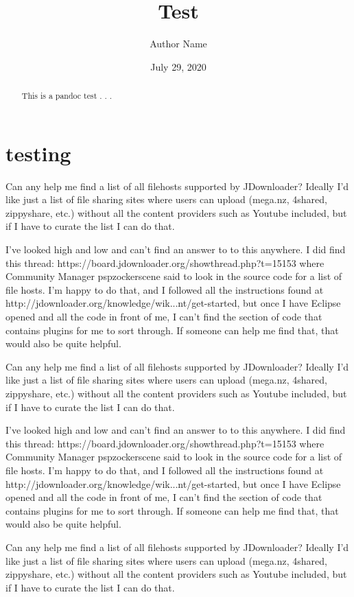 \documentclass[
]{article}
\title{Test}
\author{Author Name}
\date{July 29, 2020}
\begin{document}
\maketitle
\begin{abstract}
This is a pandoc test . . .
\end{abstract}

\hypertarget{Testing Sections}{%
\section{testing}\label{section}}

Can any help me find a list of all filehosts supported by JDownloader? Ideally I'd like just a list of file sharing sites where users can upload (mega.nz, 4shared, zippyshare, etc.) without all the content providers such as Youtube included, but if I have to curate the list I can do that.

I've looked high and low and can't find an answer to to this anywhere. I did find this thread: https://board.jdownloader.org/showthread.php?t=15153 where Community Manager pspzockerscene said to look in the source code for a list of file hosts. I'm happy to do that, and I followed all the instructions found at http://jdownloader.org/knowledge/wik...nt/get-started, but once I have Eclipse opened and all the code in front of me, I can't find the section of code that contains plugins for me to sort through. If someone can help me find that, that would also be quite helpful.

Can any help me find a list of all filehosts supported by JDownloader? Ideally I'd like just a list of file sharing sites where users can upload (mega.nz, 4shared, zippyshare, etc.) without all the content providers such as Youtube included, but if I have to curate the list I can do that.

I've looked high and low and can't find an answer to to this anywhere. I did find this thread: https://board.jdownloader.org/showthread.php?t=15153 where Community Manager pspzockerscene said to look in the source code for a list of file hosts. I'm happy to do that, and I followed all the instructions found at http://jdownloader.org/knowledge/wik...nt/get-started, but once I have Eclipse opened and all the code in front of me, I can't find the section of code that contains plugins for me to sort through. If someone can help me find that, that would also be quite helpful.

Can any help me find a list of all filehosts supported by JDownloader? Ideally I'd like just a list of file sharing sites where users can upload (mega.nz, 4shared, zippyshare, etc.) without all the content providers such as Youtube included, but if I have to curate the list I can do that.
\end{document}
